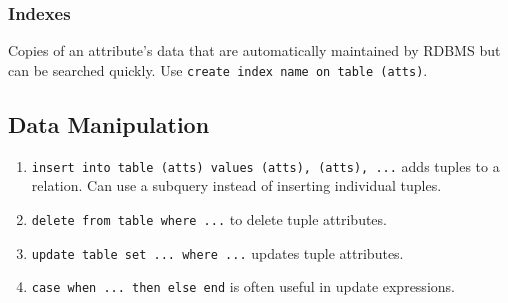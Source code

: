 \documentclass[twocolumn,english]{article}
\begin{document}
\subsubsection{Indexes}

Copies of an attribute's data that are automatically maintained by
RDBMS but can be searched quickly. Use \texttt{create index name on
table (atts)}.


\subsection{Data Manipulation}
\begin{enumerate}
\item \texttt{insert into table (atts) values (atts), (atts), ...} adds
tuples to a relation. Can use a subquery instead of inserting individual
tuples.
\item \texttt{delete from table where ...} to delete tuple attributes.
\item \texttt{update table set ... where ...} updates tuple attributes.
\item \texttt{case when ... then else end} is often useful in update expressions.
\end{enumerate}
\end{document}
